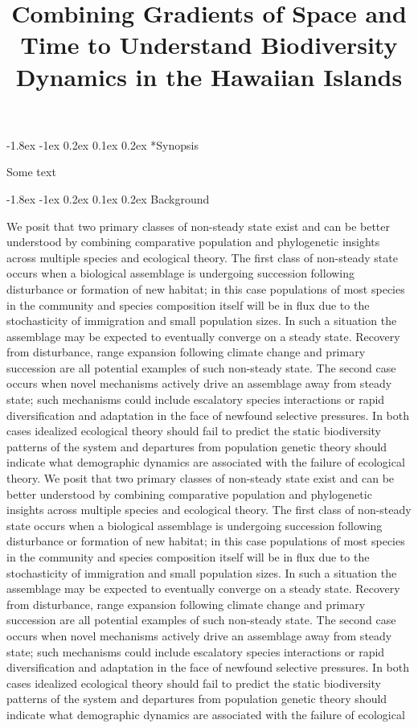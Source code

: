\documentclass[11pt]{article}
\title{Combining Gradients of Space and Time to Understand Biodiversity Dynamics in the Hawaiian Islands \vspace{-1.5ex}}
\author{}
\date{}
\makeatletter
\renewcommand\section{\@startsection{section}{1}{\z@}%
                                  {-1.8ex \@plus -1ex \@minus 0.2ex}%
                                  {0.1ex \@plus 0.2ex}%
                                  {\normalfont\Large\bfseries}}
\makeatother
\begin{document}
\maketitle
\thispagestyle{fancy} 
\vspace{-4em}


\section*{Synopsis}

Some text

\section{Background}

We posit that two primary classes of non-steady state exist and can be better understood by combining comparative population and phylogenetic insights across multiple species and ecological theory. The first class of non-steady state occurs when a biological assemblage is undergoing succession following disturbance or formation of new habitat; in this case populations of most species in the community and species composition itself will be in flux due to the stochasticity of immigration and small population sizes. In such a situation the assemblage may be expected to eventually converge on a steady state. Recovery from disturbance, range expansion following climate change and primary succession are all potential examples of such non-steady state. The second case occurs when novel mechanisms actively drive an assemblage away from steady state; such mechanisms could include escalatory species interactions or rapid diversification and adaptation in the face of newfound selective pressures. In both cases idealized ecological theory should fail to predict the static biodiversity patterns of the system and departures from population genetic theory should indicate what demographic dynamics are associated with the failure of ecological theory. We posit that two primary classes of non-steady state exist and can be better understood by combining comparative population and phylogenetic insights across multiple species and ecological theory. The first class of non-steady state occurs when a biological assemblage is undergoing succession following disturbance or formation of new habitat; in this case populations of most species in the community and species composition itself will be in flux due to the stochasticity of immigration and small population sizes. In such a situation the assemblage may be expected to eventually converge on a steady state. Recovery from disturbance, range expansion following climate change and primary succession are all potential examples of such non-steady state. The second case occurs when novel mechanisms actively drive an assemblage away from steady state; such mechanisms could include escalatory species interactions or rapid diversification and adaptation in the face of newfound selective pressures. In both cases idealized ecological theory should fail to predict the static biodiversity patterns of the system and departures from population genetic theory should indicate what demographic dynamics are associated with the failure of ecological 
\end{document}
